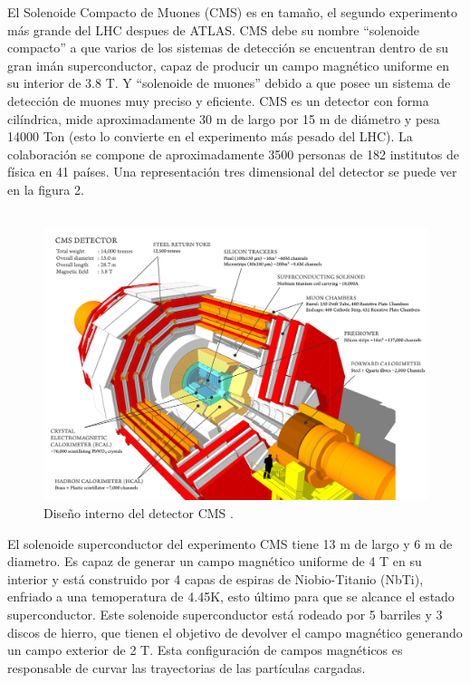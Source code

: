 El Solenoide Compacto de Muones (CMS) es en tamaño, el segundo experimento más grande del LHC despues de ATLAS. CMS debe su nombre ``solenoide compacto'' a que varios de los sistemas de detección se encuentran dentro de su gran imán superconductor, capaz de producir un campo magnético uniforme en su interior de 3.8 T. Y ``solenoide de muones'' debido a que posee un sistema de detección de muones muy preciso y eficiente. CMS es un detector con forma cilíndrica, mide aproximadamente 30 m de largo por 15 m de diámetro y pesa 14000 Ton (esto lo convierte en el experimento más pesado del LHC). La colaboración se compone de aproximadamente 3500 personas de 182 institutos de física en 41 países. Una representación tres dimensional del detector se puede ver en la figura 2.
\\
\\
\begin{figure}
\centering
\includegraphics[width=15cm]{F2.png}
\caption{\label{fig:frog} Diseño interno del detector CMS \cite{Bayatian:2006nff}.}
\end{figure}


El solenoide superconductor del experimento CMS tiene 13 m de largo y 6 m de diametro. Es capaz de generar un campo magnético uniforme de 4 T en su interior y está construido por 4 capas de espiras de Niobio-Titanio (NbTi), enfriado a una temoperatura de 4.45K, esto último para que se alcance el estado superconductor. Este solenoide superconductor está rodeado por 5 barriles y 3 discos de hierro, que tienen el objetivo de devolver el campo magnético generando un campo exterior de 2 T.  Esta configuración de campos magnéticos es responsable de curvar las trayectorias de las partículas cargadas.
\\
\\

